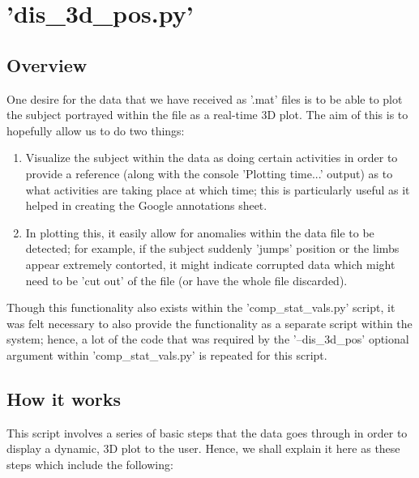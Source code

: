 \documentclass[12pt,twoside]{report}
\begin{document}
\section{'dis\_3d\_pos.py'}

\subsection{Overview}

\quad One desire for the data that we have received as '.mat' files is to be able to plot the subject portrayed within the file as a real-time 3D plot. The aim of this is to hopefully allow us to do two things:

\begin{enumerate}
	\item Visualize the subject within the data as doing certain activities in order to provide a reference (along with the console 'Plotting time...' output) as to what activities are taking place at which time; this is particularly useful as it helped in creating the Google annotations sheet.
	\item In plotting this, it easily allow for anomalies within the data file to be detected; for example, if the subject suddenly 'jumps' position or the limbs appear extremely contorted, it might indicate corrupted data which might need to be 'cut out' of the file (or have the whole file discarded).
\end{enumerate}

\quad Though this functionality also exists within the 'comp\_stat\_vals.py' script, it was felt necessary to also provide the functionality as a separate script within the system; hence, a lot of the code that was required by the '--dis\_3d\_pos' optional argument within 'comp\_stat\_vals.py' is repeated for this script.

\subsection{How it works}

\quad This script involves a series of basic steps that the data goes through in order to display a dynamic, 3D plot to the user. Hence, we shall explain it here as these steps which include the following:
\end{document}
